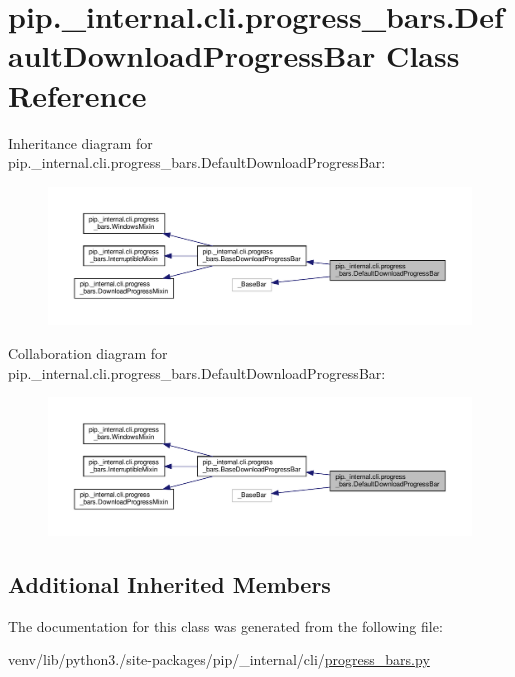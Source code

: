 \hypertarget{classpip_1_1__internal_1_1cli_1_1progress__bars_1_1DefaultDownloadProgressBar}{}\section{pip.\+\_\+internal.\+cli.\+progress\+\_\+bars.\+Default\+Download\+Progress\+Bar Class Reference}
\label{classpip_1_1__internal_1_1cli_1_1progress__bars_1_1DefaultDownloadProgressBar}


Inheritance diagram for pip.\+\_\+internal.\+cli.\+progress\+\_\+bars.\+Default\+Download\+Progress\+Bar\+:
\nopagebreak
\begin{figure}[H]
\begin{center}
\leavevmode
\includegraphics[width=350pt]{classpip_1_1__internal_1_1cli_1_1progress__bars_1_1DefaultDownloadProgressBar__inherit__graph}
\end{center}
\end{figure}


Collaboration diagram for pip.\+\_\+internal.\+cli.\+progress\+\_\+bars.\+Default\+Download\+Progress\+Bar\+:
\nopagebreak
\begin{figure}[H]
\begin{center}
\leavevmode
\includegraphics[width=350pt]{classpip_1_1__internal_1_1cli_1_1progress__bars_1_1DefaultDownloadProgressBar__coll__graph}
\end{center}
\end{figure}
\subsection*{Additional Inherited Members}


The documentation for this class was generated from the following file\+:\begin{DoxyCompactItemize}
\item 
venv/lib/python3./site-\/packages/pip/\+\_\+internal/cli/\hyperlink{progress__bars_8py}{progress\+\_\+bars.\+py}\end{DoxyCompactItemize}
